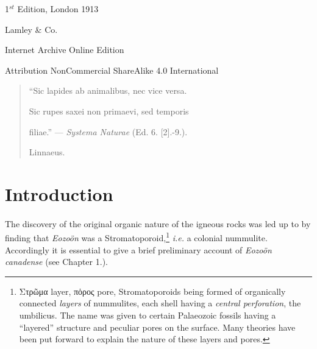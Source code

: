 \documentclass[a4paper, 12pt, oneside]{article}
\begin{document}
\begin{titlepage}
	
		
	\vspace*{\fill}%
	
	1$^{st}$ Edition, London 1913 %
	
	{\small Lamley \& Co. } %

	\vspace{1\baselineskip} %

    Internet Archive Online Edition  %
	
	{\small Attribution NonCommercial ShareAlike 4.0 International } %
\end{titlepage}
\vspace*{\fill}
\begin{quote} 
``Sic lapides ab animalibus, nec vice versa.

Sic rupes saxei non primaevi, sed temporis

filiae.'' --- \emph{Systema Naturae} (Ed. 6. [2].-9.).

Linnaeus.
\end{quote}
\vspace*{\fill}
\clearpage
\setlength{\parskip}{1mm plus1mm minus1mm}
\setcounter{tocdepth}{3}
\setcounter{secnumdepth}{3}
\tableofcontents
\clearpage
\section*{Introduction}
\paragraph{}
The discovery of the original organic nature of the igneous rocks was led up to by finding that \emph{Eozoön} was a Stromatoporoid,\footnote{Στρῶμα layer, πὁρος pore, Stromatoporoids being formed of organically connected \emph{layers} of nummulites, each shell having a \emph{central perforation}, the umbilicus. The name was given to certain Palaeozoic fossils having a ``layered'' structure and peculiar pores on the surface. Many theories have been put forward to explain the nature of these layers and pores.} \emph{i.e.} a colonial nummulite. Accordingly it is essential to give a brief preliminary account of \emph{Eozoön canadense} (see Chapter 1.).
\end{document}
